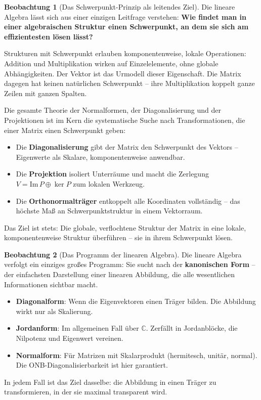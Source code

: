﻿\documentclass[a4paper,12pt]{report}
\theoremstyle{definition}
\newtheorem{beobachtung}{Beobachtung}
\begin{document}
\begin{beobachtung}[Das Schwerpunkt-Prinzip als leitendes Ziel]
    Die lineare Algebra lässt sich aus einer einzigen Leitfrage verstehen:
    \textbf{Wie findet man in einer algebraischen Struktur einen Schwerpunkt,
    an dem sie sich am effizientesten lösen lässt?}

    Strukturen mit Schwerpunkt erlauben komponentenweise, lokale Operationen:
    Addition und Multiplikation wirken auf Einzelelemente, ohne globale
    Abhängigkeiten. Der Vektor ist das Urmodell dieser Eigenschaft.
    Die Matrix dagegen hat keinen natürlichen Schwerpunkt -- ihre
    Multiplikation koppelt ganze Zeilen mit ganzen Spalten.

    Die gesamte Theorie der Normalformen, der Diagonalisierung und der
    Projektionen ist im Kern die systematische Suche nach Transformationen,
    die einer Matrix einen Schwerpunkt geben:
    \begin{itemize}
        \item[-] Die \textbf{Diagonalisierung} gibt der Matrix den Schwerpunkt
              des Vektors -- Eigenwerte als Skalare, komponentenweise anwendbar.
        \item[-] Die \textbf{Projektion} isoliert Unterräume und macht
              die Zerlegung $V = \mathrm{Im}\,P \oplus \ker P$ zum lokalen
              Werkzeug.
        \item[-] Die \textbf{Orthonormalträger} entkoppelt alle Koordinaten
              vollständig -- das höchste Maß an Schwerpunktstruktur in
              einem Vektorraum.
    \end{itemize}
    Das Ziel ist stets: Die globale, verflochtene Struktur der Matrix
    in eine lokale, komponentenweise Struktur überführen -- sie in
    ihrem Schwerpunkt lösen.
\end{beobachtung}

\begin{beobachtung}[Das Programm der linearen Algebra]
    Die lineare Algebra verfolgt ein einziges großes Programm: Sie sucht
    nach der \textbf{kanonischen Form} -- der einfachsten Darstellung einer
    linearen Abbildung, die alle wesentlichen Informationen sichtbar macht.
    \begin{itemize}
        \item[-] \textbf{Diagonalform}: Wenn die Eigenvektoren einen Träger bilden.
              Die Abbildung wirkt nur als Skalierung.
        \item[-] \textbf{Jordanform}: Im allgemeinen Fall über $\mathbb{C}$.
              Zerfällt in Jordanblöcke, die Nilpotenz und Eigenwert vereinen.
        \item[-] \textbf{Normalform}: Für Matrizen mit Skalarprodukt
              (hermitesch, unitär, normal). Die ONB-Diagonalisierbarkeit ist
              hier garantiert.
    \end{itemize}
    In jedem Fall ist das Ziel dasselbe: die Abbildung in einen Träger zu
    transformieren, in der sie maximal transparent wird.
\end{beobachtung}
\end{document}
